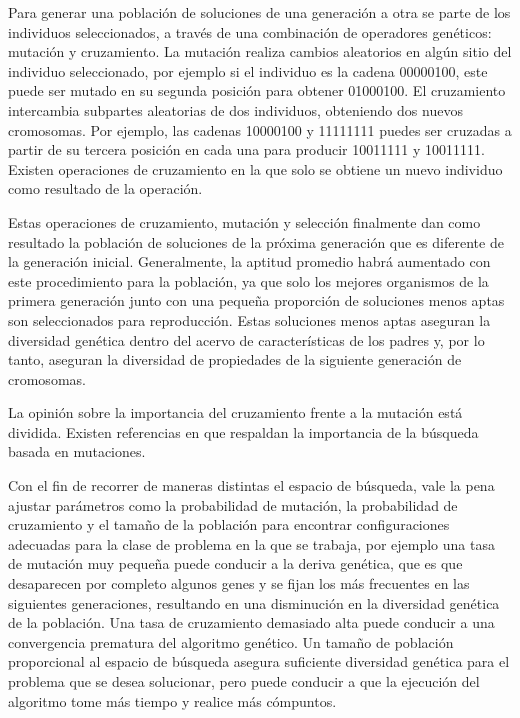 Para generar una población de soluciones de una generación a otra se parte de los individuos seleccionados, a través de una combinación de operadores genéticos: mutación y cruzamiento. La mutación realiza cambios aleatorios en algún sitio del individuo seleccionado, por ejemplo si el individuo es la cadena 00000100, este puede ser mutado en su segunda posición para obtener 01000100. El cruzamiento intercambia subpartes aleatorias de dos individuos, obteniendo dos nuevos cromosomas. Por ejemplo, las cadenas 10000100 y 11111111 puedes ser cruzadas a partir de su tercera posición en cada una para producir 10011111 y 10011111. Existen operaciones de cruzamiento en la que solo se obtiene un nuevo individuo como resultado de la operación.

Estas operaciones de cruzamiento, mutación y selección finalmente dan como resultado la población de soluciones de la próxima generación que es diferente de la generación inicial. Generalmente, la aptitud promedio habrá aumentado con este procedimiento para la población, ya que solo los mejores organismos de la primera generación junto con una pequeña proporción de soluciones menos aptas son seleccionados para reproducción. Estas soluciones menos aptas aseguran la diversidad genética dentro del acervo de características de los padres y, por lo tanto, aseguran la diversidad de propiedades de la siguiente generación de cromosomas.

La opinión sobre la importancia del cruzamiento frente a la mutación está dividida. Existen referencias en \cite{fogel2006evolutionary} que respaldan la importancia de la búsqueda basada en mutaciones.

Con el fin de recorrer de maneras distintas el espacio de búsqueda, vale la pena ajustar parámetros como la probabilidad de mutación, la probabilidad de cruzamiento y el tamaño de la población para encontrar configuraciones adecuadas para la clase de problema en la que se trabaja, por ejemplo una tasa de mutación muy pequeña puede conducir a la deriva genética, que es que desaparecen por completo algunos genes y se fijan los más frecuentes en las siguientes generaciones, resultando en una disminución en la diversidad genética de la población. Una tasa de cruzamiento demasiado alta puede conducir a una convergencia prematura del algoritmo genético. Un tamaño de población proporcional al espacio de búsqueda asegura suficiente diversidad genética para el problema que se desea solucionar, pero puede conducir a que la ejecución del algoritmo tome más tiempo y realice más cómpuntos.

